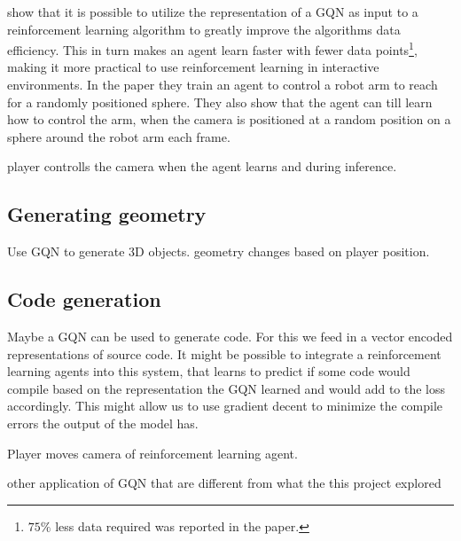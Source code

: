 \cite{gqn} show that it is possible to utilize the representation of a GQN as input to a reinforcement learning algorithm to greatly improve the algorithms data efficiency. This in turn makes an agent learn faster with fewer data points\footnote{$75\%$ less data required was reported in the paper.}, making it more practical to use reinforcement learning in interactive environments. In the paper they train an agent to control a robot arm to reach for a randomly positioned sphere. They also show that the agent can till learn how to control the arm, when the camera is positioned at a random position on a sphere around the robot arm each frame.

player controlls the camera when the agent learns and during inference.


\subsection{Generating geometry}
Use GQN to generate 3D objects.
geometry changes based on player position.


\subsection{Code generation}
Maybe a GQN can be used to generate code. For this we feed in a vector encoded representations of source code. It might be possible to integrate a reinforcement learning agents into this system, that learns to predict if some code would compile based on the representation the GQN learned and would add to the loss accordingly. This might allow us to use gradient decent to minimize the compile errors the output of the model has.


Player moves camera of reinforcement learning agent.


other application of GQN that are different from what the this project explored
